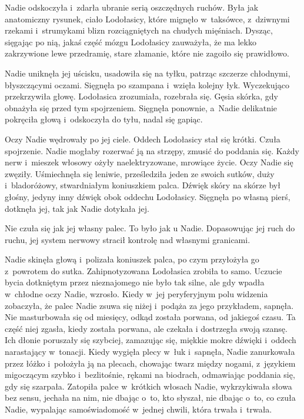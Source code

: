 \documentclass[oneside,polish,11pt,sfheadings]{mwbk}
\begin{document}
Nadie odskoczyła i~zdarła ubranie serią oszczędnych ruchów. Była jak
anatomiczny rysunek, ciało Lodołasicy, które mignęło w~taksówce, z~dziwnymi rzekami i~strumykami blizn rozciągniętych na chudych mięśniach.
Dysząc, sięgając po nią, jakaś część mózgu Lodołasicy zauważyła, że ma
lekko zakrzywione lewe przedramię, stare złamanie, które nie zagoiło się
prawidłowo.

Nadie uniknęła jej uścisku, usadowiła się na tyłku, patrząc szczerze
chłodnymi, błyszczącymi oczami. Sięgnęła po szampana i~wzięła kolejny
łyk. Wyczekująco przekrzywiła głowę. Lodołasica zrozumiała, rozebrała
się. Gęsia skórka, gdy obnażyła się przed tym spojrzeniem. Sięgnęła
ponownie, a~Nadie delikatnie pokręciła głową i~odskoczyła do tyłu, nadal
się gapiąc.

Oczy Nadie wędrowały po jej ciele. Oddech Lodołasicy stał się krótki.
Czuła spojrzenie. Nadie mogłaby rozerwać ją na strzępy, zmusić do
poddania się. Każdy nerw i~mieszek włosowy ożyły naelektryzowane,
mrowiące życie. Oczy Nadie się zwęziły. Uśmiechnęła się leniwie,
prześledziła jeden ze swoich sutków, duży i~bladoróżowy, stwardniałym
koniuszkiem palca. Dźwięk skóry na skórze był głośny, jedyny inny dźwięk
obok oddechu Lodołasicy. Sięgnęła po własną pierś, dotknęła jej, tak jak
Nadie dotykała jej.

Nie czuła się jak jej własny palec. To było jak u Nadie. Dopasowując jej
ruch do ruchu, jej system nerwowy stracił kontrolę nad własnymi
granicami.

Nadie skinęła głową i~polizała koniuszek palca, po czym przyłożyła go z~powrotem do sutka. Zahipnotyzowana Lodołasica zrobiła to samo. Uczucie
bycia dotkniętym przez nieznajomego nie było tak silne, ale gdy wpadła w~chłodne oczy Nadie, wzrosło. Kiedy w~jej peryferyjnym polu widzenia
zobaczyła, że palec Nadie zsuwa się niżej i~podąża za jego przykładem,
sapnęła. Nie masturbowała się od miesięcy, odkąd została porwana, od
jakiegoś czasu. Ta część niej zgasła, kiedy została porwana, ale czekała
i dostrzegła swoją szansę. Ich dłonie poruszały się szybciej, zamazując
się, miękkie mokre dźwięki i~oddech narastający w~tonacji. Kiedy wygięła
plecy w~łuk i~sapnęła, Nadie zanurkowała przez łóżko i~położyła ją na
plecach, chowając twarz między nogami, z~językiem migoczącym szybko i~bezlitośnie, rękami na biodrach, odmawiając poddania się, gdy się
szarpała. Zatopiła palce w~krótkich włosach Nadie, wykrzykiwała słowa
bez sensu, jechała na nim, nie dbając o~to, kto słyszał, nie dbając o~to, co czuła Nadie, wypalając samoświadomość w~jednej chwili, która
trwała i~trwała.
\end{document}
